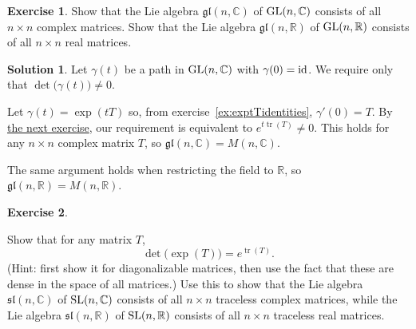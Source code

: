 \documentclass[11pt, a4paper]{report}
\theoremstyle{definition}
\newtheorem{exercise}{Exercise}[part]
\newtheorem{solution}{Solution}[part]
\newenvironment{ex}{\begin{exercise}}{\end{exercise}\pagebreak[1]}
\newenvironment{sol}{\begin{solution}}{\end{solution}\pagebreak[3]}
\newcommand*{\GL}{\ensuremath\text{GL}}
\newcommand*{\SL}{\ensuremath\text{SL}}
\newcommand*{\op}[1]{\ensuremath\mathop{}\mathopen{}#1}
\DeclareMathOperator{\tr}{tr}
\newcommand*{\id}{\op{\mathrm{id}}}
\begin{document}
\begin{ex}

Show that the Lie algebra $\mathfrak{gl}(n, \mathbb{C})$ of $\GL(n, \mathbb{C})$ consists of all $n \times n$ complex matrices.
Show that the Lie algebra $\mathfrak{gl}(n, \mathbb{R})$ of $\GL(n, \mathbb{R})$ consists of all $n \times n$ real matrices.

\end{ex}

\begin{sol}

Let $\gamma(t)$ be a path in $\GL(n, \mathbb{C})$ with $\gamma(0) = \id$.
We require only that $\det\bigl(\gamma(t)\bigr) \neq 0$.

Let $\gamma(t) = \exp(tT)$ so, from exercise~\ref{ex:exptTidentities}, $\gamma'(0) = T$.
By \hyperref[ex:detexptrace]{the next exercise}, our requirement is equivalent to $e^{t \tr(T)} \neq 0$.
This holds for any $n \times n$ complex matrix $T$, so $\mathfrak{gl}(n, \mathbb{C}) = M(n, \mathbb{C})$.

The same argument holds when restricting the field to $\mathbb{R}$, so $\mathfrak{gl}(n, \mathbb{R}) = M(n, \mathbb{R})$.

\end{sol}

\begin{ex}\label{ex:detexptrace}

Show that for any matrix $T$,
\[
    \det\bigl(\exp(T)\bigr) = e^{\tr(T)}.
\]
(Hint: first show it for diagonalizable matrices, then use the fact that these are dense in the space of all matrices.)
Use this to show that the Lie algebra $\mathfrak{sl}(n, \mathbb{C})$ of $\SL(n, \mathbb{C})$ consists of all $n \times n$ traceless complex matrices,
while the Lie algebra $\mathfrak{sl}(n, \mathbb{R})$ of $\SL(n, \mathbb{R})$ consists of all $n \times n$ traceless real matrices.

\end{ex}
\end{document}
